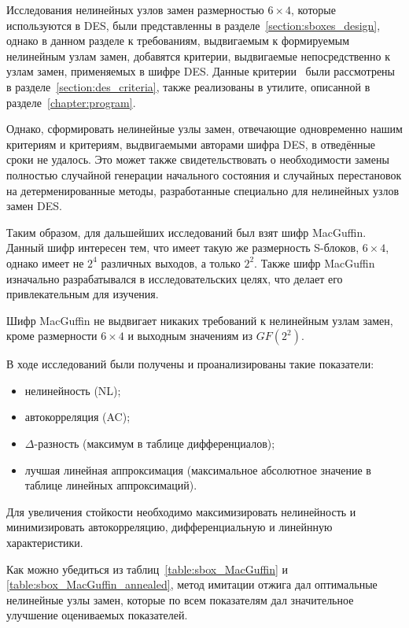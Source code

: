 Исследования нелинейных узлов замен размерностью $6 \times 4$, которые
используются в DES, были представленны в разделе~\ref{section:sboxes_design},
однако в данном разделе к требованиям, выдвигаемым к формируемым нелинейным
узлам замен, добавятся критерии, выдвигаемые непосредственно к узлам замен,
применяемых в шифре DES. Данные критерии~\cite{Coppersmith} были рассмотрены в
разделе~\ref{section:des_criteria}, также реализованы в утилите, описанной в
разделе~\ref{chapter:program}.

Однако, сформировать нелинейные узлы замен, отвечающие одновременно нашим
критериям и критериям, выдвигаемыми авторами шифра DES, в отведённые сроки не
удалось. Это может также свидетельствовать о необходимости замены полностью
случайной генерации начального состояния и случайных перестановок на
детерменированные методы, разработанные специально для нелинейных узлов замен
DES.

Таким образом, для дальшейших исследований был взят шифр MacGuffin. Данный шифр
интересен тем, что имеет такую же размерность S-блоков, $6 \times 4$, однако
имеет не $2^4$ различных выходов, а только $2^2$. Также шифр MacGuffin
изначально разрабатывался в исследовательских целях, что делает его
привлекательным для изучения.

Шифр MacGuffin не выдвигает никаких требований к нелинейным узлам замен,
кроме размерности $6 \times 4$ и выходным значениям из $GF(2^2)$.

В ходе исследований были получены и проанализированы такие показатели:
\begin{itemize}
    \item нелинейность (NL);
    \item автокорреляция (AC);
    \item $\Delta$-разность (максимум в таблице дифференциалов);
    \item лучшая линейная аппроксимация (максимальное абсолютное значение в таблице линейных аппроксимаций).
\end{itemize}

Для увеличения стойкости необходимо максимизировать нелинейность и
минимизировать автокорреляцию, дифференциальную и линейнную характеристики.

Как можно убедиться из таблиц~\ref{table:sbox_MacGuffin} и
\ref{table:sbox_MacGuffin_annealed}, метод имитации отжига дал оптимальные
нелинейные узлы замен, которые по всем показателям дал значительное улучшение
оцениваемых показателей.

